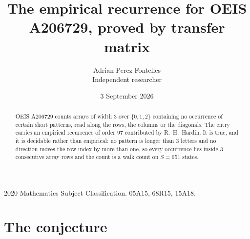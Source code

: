 \documentclass[11pt,a4paper]{article}
\title{The empirical recurrence for OEIS A206729, proved by transfer matrix}
\author{Adrian Perez Fontelles\\ \small Independent researcher}
\date{3 September 2026}
\theoremstyle{plain}
\theoremstyle{definition}
\begin{document}
\maketitle

\begin{abstract}
OEIS A206729 counts arrays of width $3$ over $\{0,1,2\}$ containing no occurrence of certain short
patterns, read along the rows, the columns or the diagonals. The entry carries an empirical
recurrence of order $97$ contributed by R.~H.~Hardin. It is true, and it is decidable
rather than empirical: no pattern is longer than $3$ letters and no direction moves the row
index by more than one, so every occurrence lies inside $3$ consecutive array rows and the
count is a walk count on $S=651$ states.
\end{abstract}

\noindent\small 2020 Mathematics Subject Classification. 05A15, 68R15, 15A18.\normalsize

\section{The conjecture}
\end{document}
